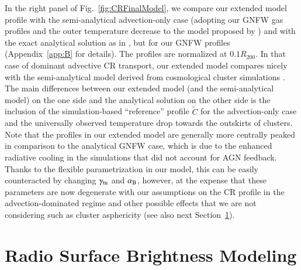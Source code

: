 \documentclass[useAMS,usenatbib]{mn2e}
\begin{document}
In the right panel of Fig.~\ref{fig:CRFinalModel}, we compare our extended model
profile with the semi-analytical advection-only case (adopting our GNFW gas
profiles and the outer temperature decrease to the model proposed by
\citealp{2010MNRAS.409..449P}) and with the exact analytical solution as in
\citet{2011A&A...527A..99E}, but for our GNFW profiles (Appendix~\ref{app:B}
for details).  The profiles are normalized at $0.1 R_{200}$. In that case of
dominant advective CR transport, our extended model compares nicely with the
semi-analytical model derived from cosmological cluster simulations
\citep{2010MNRAS.409..449P}.  The main differences between our extended model (and
the semi-analytical model) on the one side and the analytical solution on the
other side is the inclusion of the simulation-based ``reference'' profile
$\tilde{C}$ for the advection-only case and the universally observed temperature
drop towards the outskirts of clusters. Note that the profiles in our extended
model are generally more centrally peaked in comparison to the analytical GNFW
case, which is due to the enhanced radiative cooling in the
\citet{2010MNRAS.409..449P} simulations that did not account for AGN
feedback. Thanks to the flexible parametrization in our model, this can be
easily counteracted by changing $\gamma_{{\mathrm{tu}}}$ and $ \alpha_{{\mathrm{B}}}$, however, at
the expense that these parameters are now degenerate with our assumptions on the
CR profile in the advection-dominated regime and other possible effects that we
are not considering such as cluster asphericity (see also next
Section~\ref{sec:3}).


\section{Radio Surface Brightness Modeling}
\label{sec:3}
\end{document}
